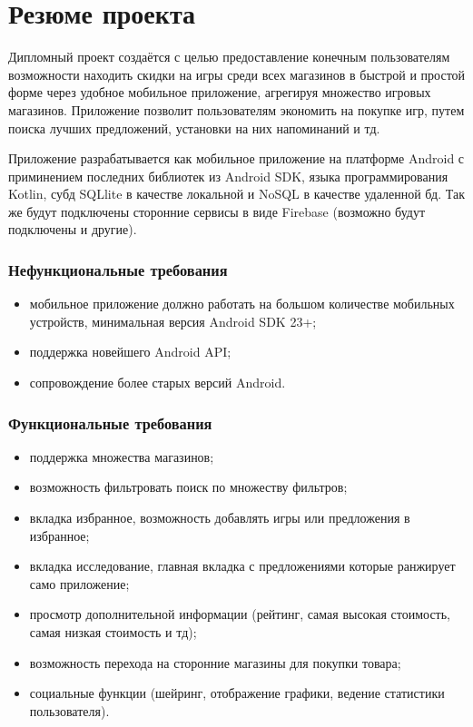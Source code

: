 \section{Резюме проекта}
\label{sec:ttt}
 
Дипломный проект создаётся с целью предоставление конечным пользователям возможности находить скидки на игры среди всех магазинов в быстрой и простой форме через удобное мобильное приложение, агрегируя множество игровых магазинов. Приложение позволит пользователям экономить на покупке игр, путем поиска лучших предложений, установки на них напоминаний и тд.

Приложение разрабатывается как мобильное приложение на платформе Android с приминением последних библиотек из Android SDK, языка программирования Kotlin, субд SQLlite в качестве локальной и NoSQL в качестве удаленной бд. Так же будут подключены сторонние сервисы в виде Firebase (возможно будут подключены и другие).

\subsubsection{Нефункциональные требования}
\begin{itemize}
 \item мобильное приложение должно работать на большом количестве мобильных устройств, минимальная версия Android SDK 23+;
 \item поддержка новейшего Android API;
 \item сопровождение более старых версий Android.
\end{itemize}
 
\subsubsection{Функциональные требования}
\begin{itemize}
  \item поддержка множества магазинов;
  \item возможность фильтровать поиск по множеству фильтров;
  \item вкладка избранное, возможность добавлять игры или предложения в избранное;
  \item вкладка исследование, главная вкладка с предложениями которые ранжирует само приложение;
  \item просмотр дополнительной информации (рейтинг, самая высокая стоимость, самая низкая стоимость и тд);
  \item возможность перехода на сторонние магазины для покупки товара;
  \item социальные функции (шейринг, отображение графики, ведение статистики пользователя).
\end{itemize}
 
